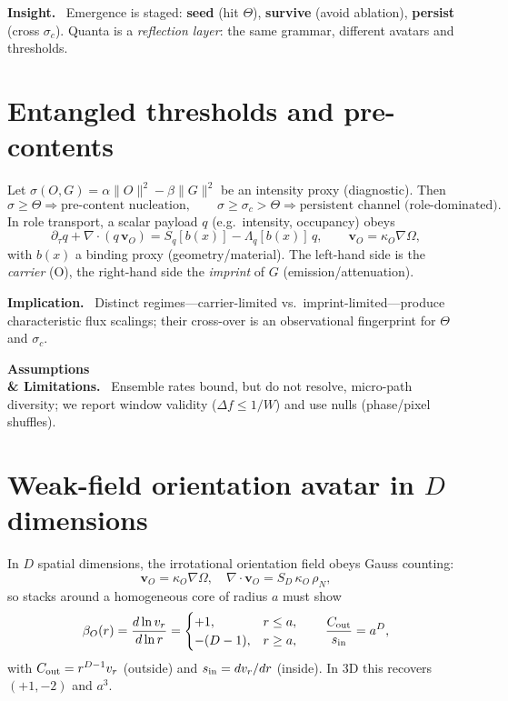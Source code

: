 \documentclass[12pt,a4paper,oneside]{scrreprt}
\newenvironment{insight}{\par\vspace{0.5em}\noindent\textbf{Insight.}\ }{\par\vspace{0.5em}}
\newenvironment{implication}{\par\vspace{0.5em}\noindent\textbf{Implication.}\ }{\par\vspace{0.5em}}
\newenvironment{limitation}{\par\vspace{0.5em}\noindent\textbf{Assumptions \\ \& Limitations.}\ }{\par\vspace{0.5em}}
\begin{document}
\begin{insight}
Emergence is staged: \textbf{seed} (hit $\Theta$), \textbf{survive} (avoid ablation), \textbf{persist} (cross $\sigma_c$). Quanta is a \emph{reflection layer}: the same grammar, different avatars and thresholds.
\end{insight}

\section{Entangled thresholds and pre-contents}\label{sec:quanta-thresholds}
Let $\sigma(O,G)=\alpha\|O\|^2-\beta\|G\|^2$ be an intensity proxy (diagnostic). Then
\[
\sigma\ge \Theta \Rightarrow \text{pre-content nucleation},\qquad
\sigma\ge \sigma_c>\Theta \Rightarrow \text{persistent channel (role-dominated)}.
\]
In role transport, a scalar payload $q$ (e.g.\ intensity, occupancy) obeys
\begin{equation}
\partial_{\tau} q + \nabla\!\cdot(q\,\mathbf v_O)= S_q[b(x)] - \Lambda_q[b(x)]\,q,
\qquad \mathbf v_O=\kappa_O\nabla\Omega, \label{eq:rt-role}
\end{equation}
with $b(x)$ a binding proxy (geometry/material). The left-hand side is the \emph{carrier} (O), the right-hand side the \emph{imprint} of $G$ (emission/attenuation).

\begin{implication}
Distinct regimes—carrier-limited vs.\ imprint-limited—produce characteristic flux scalings; their cross-over is an observational fingerprint for $\Theta$ and $\sigma_c$.
\end{implication}

\begin{limitation}
Ensemble rates bound, but do not resolve, micro-path diversity; we report window validity ($\Delta f\le 1/W$) and use nulls (phase/pixel shuffles).
\end{limitation}

\section{Weak-field orientation avatar in $D$ dimensions}\label{sec:quanta-avatar-D}
In $D$ spatial dimensions, the irrotational orientation field obeys Gauss counting:
\[
\mathbf v_O=\kappa_O\nabla\Omega,\quad
\nabla\!\cdot \mathbf v_O = S_D\,\kappa_O\,\rho_N,
\]
so stacks around a homogeneous core of radius $a$ must show
\begin{equation}
\beta_O(r)=\frac{d\ln v_r}{d\ln r}=
\begin{cases}+1,& r\le a,\\ -(D-1),& r\ge a, \end{cases}\qquad
\frac{C_{\rm out}}{s_{\rm in}}=a^D, \label{eq:quanta-T1D}
\end{equation}
with $C_{\rm out}=r^{D-1}v_r$ (outside) and $s_{\rm in}=dv_r/dr$ (inside). In 3D this recovers $(+1,-2)$ and $a^3$.
\end{document}
